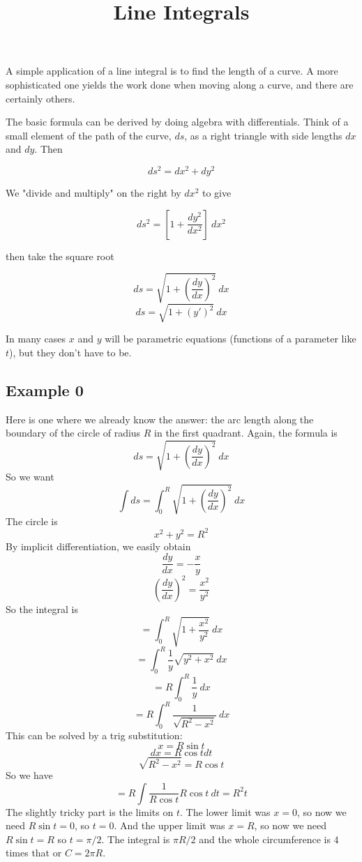 \documentclass[11pt, oneside]{article}   	%
\title{Line Integrals}
\date{}							%
\begin{document}
\maketitle
\Large

A simple application of a line integral is to find the length of a curve.  A more sophisticated one yields the work done when moving along a curve, and there are certainly others.

The basic formula can be derived by doing algebra with differentials.  Think of a small element of the path of the curve, $ds$, as a right triangle with side lengths $dx$ and $dy$.  Then

\[ ds^2 = dx^2 + dy^2 \]

We "divide and multiply" on the right by $dx^2$ to give

\[ ds^2 = [1 + \frac{dy^2}{dx^2}] \ dx^2 \]

then take the square root

\[ ds = \sqrt{1 + (\frac{dy}{dx})^2} \ dx \]
\[ ds = \sqrt{1 + (y')^2} \ dx \]

In many cases $x$ and $y$ will be parametric equations (functions of a parameter like $t$), but they don't have to be.
\subsection*{Example 0}
Here is one where we already know the answer:  the arc length along the boundary of the circle of radius $R$ in the first quadrant.  Again, the formula is
\[ ds = \sqrt{1 + (\frac{dy}{dx})^2} \ dx \]
So we want
\[ \int ds = \int_0^R  \sqrt{1 + (\frac{dy}{dx})^2} \ dx \]
The circle is
\[ x^2 + y^2 = R^2 \]
By implicit differentiation, we easily obtain
\[ \frac{dy}{dx} = -\frac{x}{y} \]
\[ (\frac{dy}{dx})^2 = \frac{x^2}{y^2} \]
So the integral is
\[ = \int_0^R  \sqrt{1 + \frac{x^2}{y^2}} \ dx \]
\[ = \int_0^R \frac{1}{y}  \sqrt{y^2 + x^2} \ dx \]
\[ = R \int_0^R \frac{1}{y}  \ dx \]
\[ = R \int_0^R \frac{1}{\sqrt{R^2-x^2}}  \ dx \]
This can be solved by a trig substitution:
\[ x = R \sin t \]
\[ dx = R \cos t dt \]
\[ \sqrt{R^2 - x^2} = R \cos t \]
So we have
\[ = R \int \frac{1}{R \cos t} R \cos t \ dt = R^2 t \]
The slightly tricky part is the limits on $t$.  The lower limit was $x=0$, so now we need $R \sin t = 0$, so $t=0$.  And the upper limit was $x=R$, so now we need $R \sin t = R$ so $t = \pi/2$.  The integral is $\pi R/2$ and the whole circumference is $4$ times that or $C = 2 \pi R$.
\end{document}
